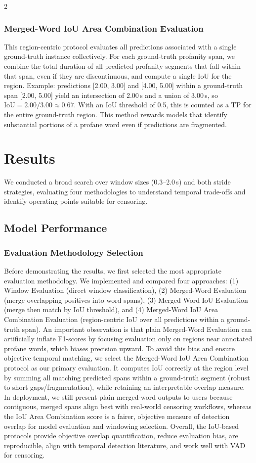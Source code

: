 \documentclass[11pt,a4paper]{article}
\begin{document}
\begin{multicols}{2}
\subsubsection{Merged-Word IoU Area Combination Evaluation}
This region-centric protocol evaluates all predictions associated with a single ground-truth instance collectively. For each ground-truth profanity span, we combine the total duration of all predicted profanity segments that fall within that span, even if they are discontinuous, and compute a single IoU for the region. Example: predictions [2.00, 3.00] and [4.00, 5.00] within a ground-truth span [2.00, 5.00] yield an intersection of 2.00\,s and a union of 3.00\,s, so $\mathrm{IoU} = 2.00/3.00 \approx 0.67$. With an IoU threshold of 0.5, this is counted as a TP for the entire ground-truth region. This method rewards models that identify substantial portions of a profane word even if predictions are fragmented.

\section{Results}
We conducted a broad search over window sizes (0.3--2.0\,s) and both stride strategies, evaluating four methodologies to understand temporal trade-offs and identify operating points suitable for censoring.

\subsection{Model Performance}
\subsubsection{Evaluation Methodology Selection}
Before demonstrating the results, we first selected the most appropriate evaluation methodology. We implemented and compared four approaches: (1) Window Evaluation (direct window classification), (2) Merged-Word Evaluation (merge overlapping positives into word spans), (3) Merged-Word IoU Evaluation (merge then match by IoU threshold), and (4) Merged-Word IoU Area Combination Evaluation (region-centric IoU over all predictions within a ground-truth span). An important observation is that plain Merged-Word Evaluation can artificially inflate F1-scores by focusing evaluation only on regions near annotated profane words, which biases precision upward. To avoid this bias and ensure objective temporal matching, we select the Merged-Word IoU Area Combination protocol as our primary evaluation. It computes IoU correctly at the region level by summing all matching predicted spans within a ground-truth segment (robust to short gaps/fragmentation), while retaining an interpretable overlap measure. In deployment, we still present plain merged-word outputs to users because contiguous, merged spans align best with real-world censoring workflows, whereas the IoU Area Combination score is a fairer, objective measure of detection overlap for model evaluation and windowing selection. Overall, the IoU-based protocols provide objective overlap quantification, reduce evaluation bias, are reproducible, align with temporal detection literature, and work well with VAD for censoring.


\end{multicols}
\end{document}
